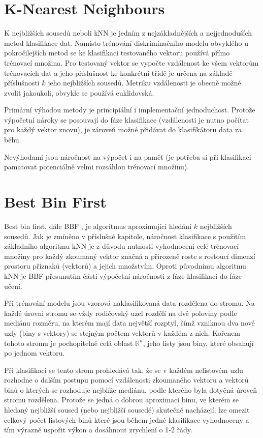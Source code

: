 \section{K-Nearest Neighbours}

	K nejbližších sousedů neboli kNN je jedním z nejzákladnějších a nejjednoduších metod klasifikace dat. Namísto trénování diskriminačního modelu obvyklého u pokročilejších metod se ke klasifikaci testovaného vektoru používá přímo trénovací množina. Pro testovaný vektor se vypočte vzdálenost ke všem vektorům trénovacích dat a jeho příslušnost ke konkrétní třídě je určena na základě příslušnosti $k$ jeho nejbližších sousedů. Metriku vzdálenosti je obecně možné zvolit jakoukoli, obvykle se používá euklidovská.
	
	Primární výhodou metody je principiální i implementační jednoduchost. Protože výpočetní nároky se posouvají do fáze klasifikace (vzdálenosti je nutno počítat pro každý vektor znovu), je zároveň možné přidávat do klasifikátoru data za běhu.
	
	Nevýhodami jsou náročnost na výpočet i na paměť (je potřeba si při klasifikaci pamatovat potenciálně velmi rozsáhlou trénovací množinu).
	
\section{Best Bin First}
\label{sec:bbf}
	Best bin first, dále BBF \cite{beis1997shape}, je algoritmus aproximující hledání $k$ nejbližších sousedů. Jak je zmíněno v příslušné kapitole, náročnost klasifikace s použitím základního algoritmu kNN je z důvodu nutnosti vyhodnocení celé trénovací množiny pro každý zkoumaný vektor značná a přirozeně roste s rostoucí dimenzí prostoru příznaků (vektorů) a jejich množstvím. Oproti původnímu algoritmu kNN je BBF přesunutím části výpočetní náročnosti z fáze klasifikaci do fáze učení.
	
	Při trénování modelu jsou vzorová naklasifikovaná data rozdělena do stromu. Na každé úrovni stromu se vždy rodičovský uzel rozdělí na dvě poloviny podle mediánu rozměru, na kterém mají data největší rozptyl, čímž vzniknou dva nové uzly (biny s vektory) se stejným počtem vektorů v každém z nich. Kořenem tohoto stromu je pochopitelně celá oblast $\mathbb{R}^n$, jeho listy jsou biny, které obsahují po jednom vektoru.
	
	Při klasifikaci se tento strom prohledává tak, že se v každém nelistovém uzlu rozhodne o dalším postupu pomocí vzdálenosti zkoumaného vektoru a vektorů binů o kterých se rozhoduje nejblíže mediánu, podle kterého byla dotyčná úroveň stromu rozdělena. Protože se jedná o dobrou aproximaci binu, ve kterém se hledaný nejbližší soused (nebo nejbližší sousedé) skutečně nacházejí, lze omezit celkový počet listových binů které jsou během jedné klasifikace vyhodnoceny a tím výrazně uspořit výkon a dosáhnout zrychlení o 1-2 řády.
	
